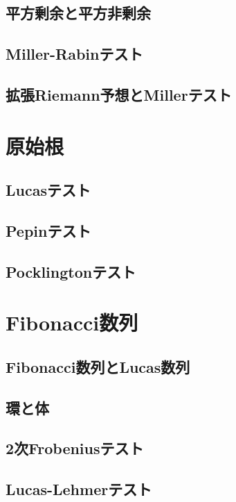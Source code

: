 \subsection{平方剰余と平方非剰余}

\subsection{Miller-Rabinテスト}

\subsection{拡張Riemann予想とMillerテスト}


\section{原始根}
\subsection{Lucasテスト}

\subsection{Pepinテスト}

\subsection{Pocklingtonテスト}


\section{Fibonacci数列}
\subsection{Fibonacci数列とLucas数列}

\subsection{環と体}

\subsection{2次Frobeniusテスト}

\subsection{Lucas-Lehmerテスト}

